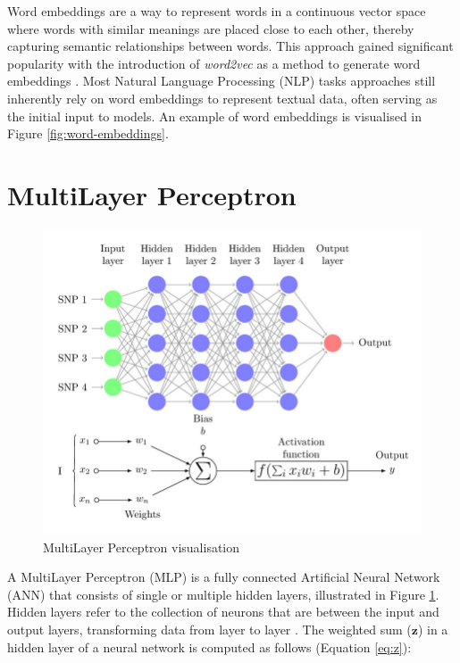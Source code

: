 Word embeddings are a way to represent words in a continuous vector space where words with similar meanings are placed close to each other, thereby capturing semantic relationships between words. This approach gained significant popularity with the introduction of \textit{word2vec} as a method to generate word embeddings \cite{mikolov-2013-embeddings}. Most Natural Language Processing (NLP) tasks approaches still inherently rely on word embeddings to represent textual data, often serving as the initial input to models. An example of word embeddings is visualised in Figure \ref{fig:word-embeddings}.


\section{MultiLayer Perceptron}

\begin{figure}[htbp]
    \centering
    \includegraphics[width=0.9\linewidth]{images/mlp.png}
    \caption{MultiLayer Perceptron visualisation \cite{perez-enciso-2019-guide}}
    \label{fig:mlp}
\end{figure}

A MultiLayer Perceptron (MLP) is a fully connected Artificial Neural Network (ANN) that consists of single or multiple hidden layers, illustrated in Figure \ref{fig:mlp}. Hidden layers refer to the collection of neurons that are between the input and output layers, transforming data from layer to layer \cite{uzair-2020-hidden-layers}. The weighted sum (\( \mathbf{z} \)) in a hidden layer of a neural network is computed as follows (Equation \eqref{eq:z}):


